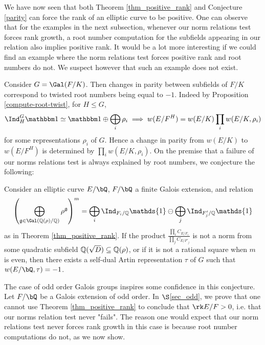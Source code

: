 We have now seen that both Theorem \ref{thm_positive_rank} and Conjecture \ref{parity} can force the rank of an elliptic curve to be positive. One can observe that for the examples in the next subsection, whenever our norm relations test forces rank growth, a root number computation for the subfields appearing in our relation also implies positive rank. 
It would be a lot more interesting if we could find an example where the norm relations test forces positive rank and root numbers do not. 
We suspect however that such an example does not exist. 

Consider $G = \Gal(F / K)$. Then changes in parity between subfields of $F / K$ correspond to twisted root numbers being equal to $-1$. Indeed by Proposition \ref{compute-root-twist}, for $H \leq G$, 
\[ \Ind_{H}^G \trivial \simeq \trivial\oplus \bigoplus_i \rho_i  \implies w(E / F^H) = w(E / K)\prod_i w(E / K, \rho_i) \] for some representations $\rho_i $ of $G $. Hence a change in parity from $w(E / K)$ to $w(E / F^H)$ is determined by $\prod_i w(E / K, \rho_i)$. On the premise that a failure of our norms relations test is always explained by root numbers, we conjecture the following:

\begin{conj}
Consider an elliptic curve $E / \bQ$, $F / \bQ$ a finite Galois extension, and relation 
$$\left(\bigoplus_{\mathfrak{g}\in\Gal(\QQ(\rho)/\QQ)}\rho^{\mathfrak{g}}\right)^m=\bigoplus_i\Ind_{F_i/\QQ}\mathds{1}\ominus\bigoplus_j\Ind_{F'_j/\QQ}\mathds{1}$$
as in Theorem \ref{thm_positive_rank}. If the product $\frac{\prod_i C_{E/F_i}}{\prod_j C_{E/F'_j}}$ is not a norm from some quadratic subfield $\mathbb{Q}(\sqrt{D})\subseteq\mathbb{Q}(\rho)$, or if it is not a rational square when $m$ is even, then there exists a self-dual Artin representation $\tau$ of $G$ such that $w(E / \bQ, \tau) = -1 $. 
\end{conj}

The case of odd order Galois groups inspires some confidence in this conjecture. Let $F / \bQ$ be a Galois extension of odd order. In $\S$\ref{sec_odd}, we prove that one cannot use Theorem \ref{thm_positive_rank} to conclude that $\rk E / F > 0$, i.e. that our norms relation test never "fails".
The reason one would expect that our norm relations test never forces rank growth in this case is because root number computations do not, as we now show.

